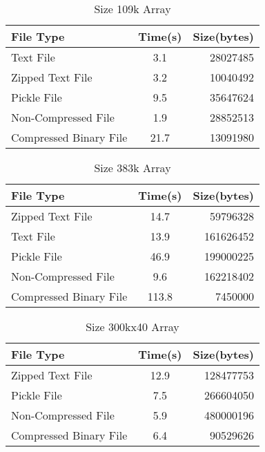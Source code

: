 \begin{table}[h!]
    \begin{center}
        \caption{Size 109k Array}
        \begin{tabular}{l|c|r}
            File Type & Time(s) & Size(bytes)\\
            \hline
            Text File &3.1 & 28027485\\
            \hline
             Zipped Text File & 3.2 & 10040492\\
            \hline
            Pickle File & 9.5 & 35647624\\  
            \hline
            Non-Compressed File & 1.9 & 28852513\\
            \hline
            Compressed Binary File & 21.7 & 13091980\\ 
        \end{tabular}
    \end{center}
\end{table}


\begin{table}[h!]
    \begin{center}
        \caption{Size 383k Array}
        \begin{tabular}{l|c|r}
            File Type & Time(s) & Size(bytes)\\
            \hline
            Zipped Text File & 14.7 & 59796328\\
            \hline
            Text File &13.9 & 161626452\\    
            \hline
            Pickle File & 46.9 & 199000225\\
            \hline
            Non-Compressed File & 9.6 &162218402\\
            \hline
            Compressed Binary File & 113.8 & 7450000\\
        \end{tabular}
    \end{center}
\end{table}



\begin{table}[h!]
    \begin{center}
        \caption{Size 300kx40 Array}
        \begin{tabular}{l|c|r}
            File Type & Time(s) & Size(bytes)\\
            \hline
            Zipped Text File & 12.9 & 128477753\\
            \hline
            Pickle File & 7.5 & 266604050\\
            \hline
            Non-Compressed File & 5.9 &480000196\\
            \hline
            Compressed Binary File & 6.4 & 90529626\\
        \end{tabular}
    \end{center}
\end{table}




